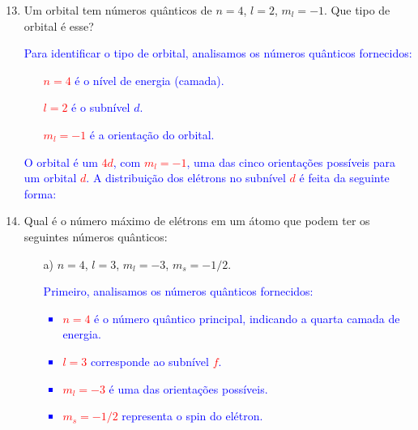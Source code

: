 \documentclass[a4paper, 12pt]{article}
\begin{document}
\begin{enumerate}
	\setcounter{enumi}{12}
	\item Um orbital tem números quânticos de \(n = 4\), \(l = 2\), \(m_l = -1\). Que tipo de orbital é esse?
	      
	      \textcolor{blue}{
		      Para identificar o tipo de orbital, analisamos os números quânticos fornecidos:
		      \begin{itemize}
			      \item[] \textcolor{red}{\(n = 4\)} é o nível de energia (camada).
			      \item[] \textcolor{red}{\(l = 2\)} é o subnível \(d\).
			      \item[] \textcolor{red}{\(m_l = -1\)} é a orientação do orbital.
		      \end{itemize}
		      O orbital é um \textcolor{red}{\(4d\)}, com \textcolor{red}{\(m_l = -1\)}, uma das cinco orientações possíveis para um orbital \textcolor{red}{\(d\)}. A distribuição dos elétrons no subnível \textcolor{red}{\(d\)} é feita da seguinte forma:    
		      \begin{itemize}
			      \item[] 
			      \item[] 
		      \end{itemize}
	      }
	      
	      
	      \textcolor{blue}{}
	      \pagebreak
	\item Qual é o número máximo de elétrons em um átomo que podem ter os seguintes números quânticos:
	      \begin{enumerate}
		      \item[a)] \(n = 4\), \(l = 3\), \(m_l = -3\), \(m_s = -1/2\).
		            \setlength{\columnsep}{0.1cm}
		            \begin{multicols}{2}
			            
			            
			            \columnbreak
			            \small 
			            \textcolor{blue}{
				            \textcolor{blue}{Primeiro, analisamos os números quânticos fornecidos:}
				            \begin{itemize}
					            \item \textcolor{red}{\(n = 4\)} é o número quântico principal, indicando a quarta camada de energia.
					            \item \textcolor{red}{\(l = 3\)} corresponde ao subnível \textcolor{red}{\(f\)}.
					            \item \textcolor{red}{\(m_l = -3\)} é uma das orientações possíveis.
					            \item \textcolor{red}{\(m_s = -1/2\)} representa o spin do elétron.
				            \end{itemize}
			            }
			            

\end{multicols}
\end{enumerate}
\end{enumerate}
\end{document}
